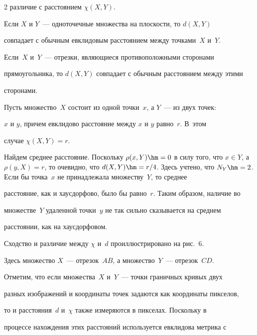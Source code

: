 \begin{multicols}{2}
различие с расстоянием $\chi(X, Y)$.


  


  Если $X$ и $Y$~--- одноточечные множества на плоскости, то $d(X, Y)$ 


совпадает с обычным евклидовым расстоянием между точками~$X$ и~$Y$. 


Если~$X$ и~$Y$~--- отрезки, являющиеся противоположными сторонами 


прямоугольника, то $d(X, Y)$ совпадает с обычным расстоянием между этими 


сторонами.


  


  Пусть множество~$X$ состоит из одной точки~$x$, а $Y$~--- из двух точек: 


$x$ и $y$, причем евклидово расстояние между $x$ и $y$ равно~$r$. В~этом 


случае $\chi(X, Y) = r$.


  


  Найдем среднее расстояние. Поскольку $\rho(x, Y) \hm= 0$ в силу того, что $x\in 


Y$, а $\rho(y, X) = r$, то очевидно, что $d(X, Y) \hm= r/4$. Здесь учтено, что $N_Y \hm= 


2$. Если бы точка~$x$ не принадлежала множеству~$Y$, то среднее 


расстояние, как и хаусдорфово, было бы равно~$r$. Таким образом, наличие во 


множестве~$Y$ удаленной точки~$y$ не так сильно сказывается на среднем 


расстоянии, как на хаусдорфовом.


  


  Сходство и различие между $\chi$ и~$d$ проиллюстрировано на рис.~6. 


Здесь множество $X$~--- отрезок~$AB$, а множество~$Y$~--- отрезок~$CD$.





  Отметим, что если множества~$X$ и~$Y$~--- точки граничных кривых двух 


разных изображений и координаты точек задаются как координаты пикселов, 


то и расстояния~$d$ и~$\chi$ также измеряются в пикселах. Поскольку в 


процессе нахождения этих расстояний используется евклидова метрика с 



\end{multicols}

